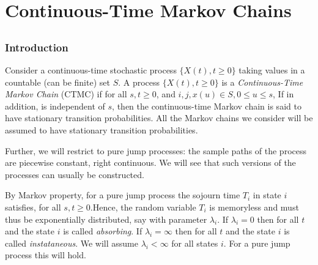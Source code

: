\documentclass[all-lectures.tex]{subfiles}
\begin{document}

\chapter{Continuous-Time Markov Chains}
\setcounter{section}{1}
\setcounter{subsection}{0}

\section*{}
\subsection{Introduction}
Consider a continuous-time stochastic process $\{X(t),t\ge0\}$ taking values in a countable (can be finite) set $S$.
A process $\{X(t),t\ge0\}$ is a \textit{Continuous-Time Markov Chain} (CTMC) if for all $s,t \ge 0$, and $i,j,x(u) \in S, 0\le u\le s$,
If in addition,
is independent of $s$, then the continuous-time Markov chain is said to have stationary transition probabilities. 
All the Markov chains we consider will be assumed to have stationary transition probabilities.

Further, we will restrict to pure jump processes: the sample paths of the process are piecewise constant, right continuous. We will see that such versions of the processes can usually be constructed.

By Markov property, for a pure jump process the sojourn time $T_i$ in state $i$ satisfies,
for all $s,t \ge 0$.Hence, the random variable $T_i$ is memoryless and must thus be exponentially distributed, say with parameter $\lambda_i$.
If $\lambda_i = 0$ then
for all $t$ and the state $i$ is called \textit{absorbing}.
If $\lambda_i = \infty$ then
for all $t$ and the state $i$ is called \textit{instataneous}. We will assume $\lambda_i < \infty$ for all states $i$. For a pure jump process this will hold.
\end{document}
